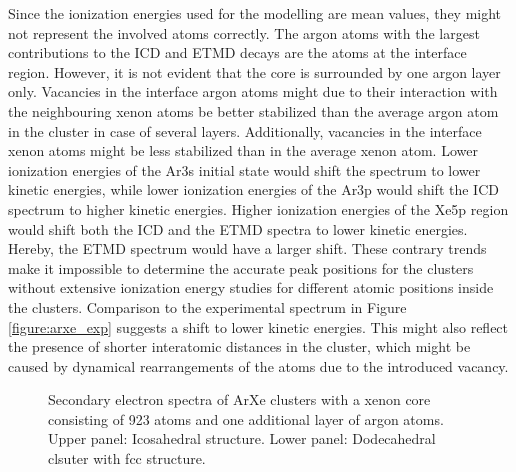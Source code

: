 Since the ionization energies used for the modelling are mean values, they
might not represent the involved atoms correctly. The argon atoms with the
largest contributions to the ICD and ETMD decays are the atoms at the interface
region. However, it is not evident that the core is surrounded by one argon
layer only. Vacancies in the interface argon atoms might due to
their interaction with the
neighbouring xenon atoms be better stabilized than the average argon atom in the
cluster in case of several layers. Additionally, vacancies in the interface
xenon atoms might be less stabilized than in the average xenon atom.
Lower ionization energies of the Ar3s initial state would shift the spectrum
to lower kinetic energies, while lower ionization energies of the Ar3p
would shift the \ac{ICD} spectrum to higher kinetic energies.
Higher ionization energies of the Xe5p region would shift both the ICD and
the ETMD spectra to lower kinetic energies. Hereby, the ETMD spectrum would
have a larger shift. These contrary trends make it impossible to determine the
accurate peak positions for the clusters without extensive ionization energy
studies for different atomic positions inside the clusters.
Comparison to the experimental spectrum in Figure \ref{figure:arxe_exp}
suggests a shift to lower kinetic energies.
This might also reflect the presence of shorter interatomic distances
in the cluster,
which might be caused by dynamical rearrangements of the atoms due to
the introduced vacancy.


\begin{figure}[]
 \centering
 
 
 \caption{Secondary electron spectra of ArXe clusters with a xenon core
          consisting of 923 atoms and one additional layer of argon atoms.\\
          Upper panel: Icosahedral structure. Lower panel: Dodecahedral
          clsuter with fcc structure.}
 \label{figure:exp_923_arxe}
\end{figure}


